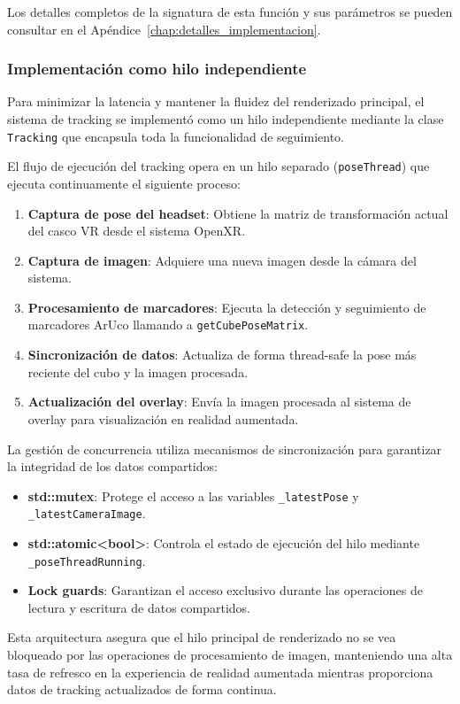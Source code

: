 Los detalles completos de la signatura de esta función y sus parámetros se pueden consultar en el Apéndice~\ref{chap:detalles_implementacion}.

\subsubsection{Implementación como hilo independiente}
Para minimizar la latencia y mantener la fluidez del renderizado principal, el sistema de tracking se implementó como un hilo independiente mediante la clase \texttt{Tracking} que encapsula toda la funcionalidad de seguimiento.

El flujo de ejecución del tracking opera en un hilo separado (\texttt{poseThread}) que ejecuta continuamente el siguiente proceso:

\begin{enumerate}
    \item \textbf{Captura de pose del headset}: Obtiene la matriz de transformación actual del casco VR desde el sistema OpenXR.
    \item \textbf{Captura de imagen}: Adquiere una nueva imagen desde la cámara del sistema.
    \item \textbf{Procesamiento de marcadores}: Ejecuta la detección y seguimiento de marcadores ArUco llamando a \texttt{getCubePoseMatrix}.
    \item \textbf{Sincronización de datos}: Actualiza de forma thread-safe la pose más reciente del cubo y la imagen procesada.
    \item \textbf{Actualización del overlay}: Envía la imagen procesada al sistema de overlay para visualización en realidad aumentada.
\end{enumerate}

La gestión de concurrencia utiliza mecanismos de sincronización para garantizar la integridad de los datos compartidos:
\begin{itemize}
    \item \textbf{std::mutex}: Protege el acceso a las variables \texttt{\_latestPose} y \texttt{\_latestCameraImage}.
    \item \textbf{std::atomic<bool>}: Controla el estado de ejecución del hilo mediante \texttt{\_poseThreadRunning}.
    \item \textbf{Lock guards}: Garantizan el acceso exclusivo durante las operaciones de lectura y escritura de datos compartidos.
\end{itemize}

Esta arquitectura asegura que el hilo principal de renderizado no se vea bloqueado por las operaciones de procesamiento de imagen, manteniendo una alta tasa de refresco en la experiencia de realidad aumentada mientras proporciona datos de tracking actualizados de forma continua.

